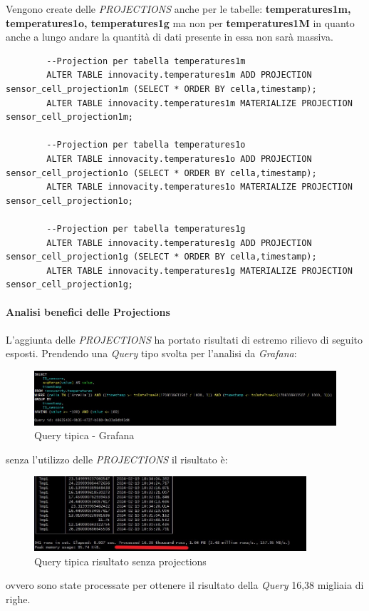     Vengono create delle \textit{PROJECTIONS} anche per le tabelle:  \textbf{temperatures1m, temperatures1o, temperatures1g}
    ma non per  \textbf{temperatures1M} in quanto anche a lungo andare la quantità di dati presente in essa non sarà massiva.

    \begin{lstlisting}
        --Projection per tabella temperatures1m
        ALTER TABLE innovacity.temperatures1m ADD PROJECTION sensor_cell_projection1m (SELECT * ORDER BY cella,timestamp);
        ALTER TABLE innovacity.temperatures1m MATERIALIZE PROJECTION sensor_cell_projection1m;

        --Projection per tabella temperatures1o
        ALTER TABLE innovacity.temperatures1o ADD PROJECTION sensor_cell_projection1o (SELECT * ORDER BY cella,timestamp);
        ALTER TABLE innovacity.temperatures1o MATERIALIZE PROJECTION sensor_cell_projection1o;

        --Projection per tabella temperatures1g
        ALTER TABLE innovacity.temperatures1g ADD PROJECTION sensor_cell_projection1g (SELECT * ORDER BY cella,timestamp);
        ALTER TABLE innovacity.temperatures1g MATERIALIZE PROJECTION sensor_cell_projection1g;
    \end{lstlisting}

    \paragraph{Analisi benefici delle Projections}
    L'aggiunta delle \textit{PROJECTIONS} ha portato risultati di estremo rilievo di seguito esposti.
    Prendendo una \textit{Query} tipo svolta per l'analisi da \textit{Grafana}:
    \begin{figure}[H]
        \centering
        \includegraphics[width=1\textwidth]{../Images/SpecificaTecnica/ProjectionQuery.jpg}
        \caption{Query tipica - Grafana}
        \label{fig:ProjectionsQuery}
      \end{figure}
    senza l'utilizzo delle \textit{PROJECTIONS} il risultato è:
    \begin{figure}[H]
        \centering
        \includegraphics[width=0.9\textwidth]{../Images/SpecificaTecnica/SenzaProectionResult.jpg}
        \caption{Query tipica risultato senza projections}
        \label{fig:ProjectionsQueryWthout}
      \end{figure}
      ovvero sono state processate per ottenere il risultato della \textit{Query} 16,38 migliaia di righe.

